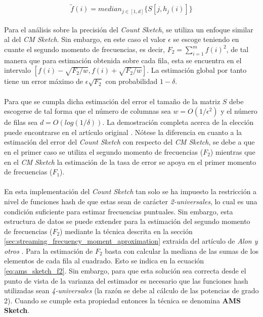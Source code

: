 \documentclass{subfiles}
\begin{document}
      \begin{equation}
      \label{eq:count_sketch_estimation_2}
      \widetilde{f}(i) = median_{j \in [1,d]}\{S[j, h_j(i)]\}
      \end{equation}

      \paragraph{}
      Para el análisis sobre la precisión del \emph{Count Sketch}, se utiliza un enfoque similar al del \emph{CM Sketch}. Sin embargo, en este caso el valor $\epsilon$ se escoge teniendo en cuante el segundo momento de frecuencias, es decir, $F_2 = \sum_{i=1}^mf(i)^2$, de tal manera que para estimación obtenida sobre cada fila, esta se encuentra en el intervalo $[f(i) - \sqrt{F_2/w}, f(i) + \sqrt{F_2/w}]$. La estimación global por tanto tiene un error máximo de $\epsilon\sqrt{F_2}$ con probabilidad $1- \delta$.

      \paragraph{}
      Para que se cumpla dicha estimación del error el tamaño de la matriz $S$ debe escogerse de tal forma que el número de columnas sea $w = O(1/\epsilon^2)$ y el número de filas sea $d = O(log(1/\delta))$. La demostración completa acerca de la elección puede encontrarse en el artículo original \cite{charikar2002finding}. Nótese la diferencia en cuanto a la estimación del error del \emph{Count Sketch} con respecto del \emph{CM Sketch}, se debe a que en el primer caso se utiliza el segundo momento de frecuencias ($F_2$) mientras que en el \emph{CM Sketch} la estimación de la tasa de error se apoya en el primer momento de frecuencias ($F_1$).

      \paragraph{}
      En esta implementación del \emph{Count Sketch} tan solo se ha impuesto la restricción a nivel de funciones hash de que estas sean de carácter \emph{2-universales}, lo cual es una condición suficiente para estimar frecuencias puntuales. Sin embargo, esta estructura de datos se puede extender para la estimación del segundo momento de frecuencias ($F_2$) mediante la técnica descrita en la sección \ref{sec:streaming_frecuency_moment_aproximation} extraida del artículo de \emph{Alon y otros} \cite{alon1996space}. Para la estimación de $F_2$ basta con calcular la mediana de las sumas de los elementos de cada fila al cuadrado. Esto se indica en la ecuación \eqref{eq:ams_sketch_f2}. Sin embargo, para que esta solución sea correcta desde el punto de vista de la varianza del estimador es necesario que las funciones hash utilizadas sean \emph{4-universales} (la razón se debe al cálculo de las potencias de grado 2). Cuando se cumple esta propiedad entonces la técnica se denomina \textbf{AMS Sketch}.
\end{document}

